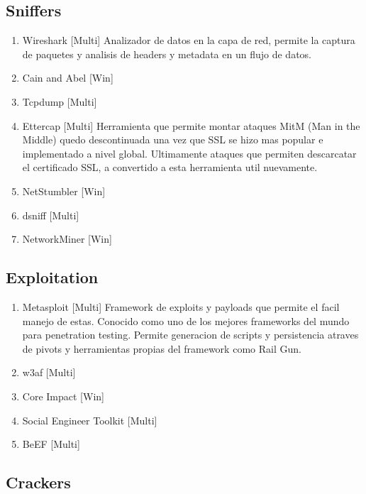 \subsection{Sniffers}
\begin{enumerate}
\item{Wireshark [Multi]}
Analizador de datos en la capa de red, permite la captura de paquetes y analisis de headers y metadata en un flujo de datos.
\item{Cain and Abel [Win] }
\item{Tcpdump [Multi] }
\item{Ettercap [Multi] }
Herramienta que permite montar ataques MitM (Man in the Middle) quedo descontinuada una vez que SSL se hizo mas popular e implementado a nivel global. Ultimamente ataques que permiten descarcatar el certificado SSL, a convertido a esta herramienta util nuevamente.
\item{NetStumbler [Win] }
\item{dsniff [Multi] }
\item{NetworkMiner [Win] }
\end{enumerate}

\subsection{Exploitation}

\begin{enumerate}
\item{Metasploit [Multi]}
Framework de exploits y payloads que permite el facil manejo de estas. Conocido como uno de los mejores frameworks del mundo para penetration testing. Permite generacion de scripts y persistencia atraves de pivots y herramientas propias del framework como Rail Gun.
\item{w3af [Multi] }
\item{Core Impact [Win] }
\item{Social Engineer Toolkit [Multi] }
\item{BeEF [Multi]}
\end{enumerate}

\subsection{Crackers}

